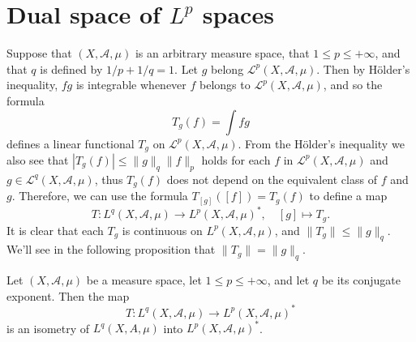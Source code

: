 \section{Dual space of \boldmath$L^p$ spaces}
Suppose that $(X,\mathcal{A},\mu)$ is an arbitrary measure space, that $1\leq p\leq +\infty$, and that $q$ is defined by $1/p+1/q=1$. Let $g$ belong $\mathcal{L}^p(X,\mathcal{A},\mu)$. Then by H\"older's inequality, $fg$ is integrable whenever $f$ belongs to $\mathcal{L}^p(X,\mathcal{A},\mu)$, and so the formula
\[T_g(f)=\int fg\]
defines a linear functional $T_g$ on $\mathcal{L}^p(X,\mathcal{A},\mu)$. From the H\"older's inequality we also see that $|T_g(f)|\leq\|g\|_q\|f\|_p$ holds for each $f$ in $\mathcal{L}^p(X,\mathcal{A},\mu)$ and $g\in\mathcal{L}^q(X,\mathcal{A},\mu)$, thus $T_g(f)$ does not depend on the equivalent class of $f$ and $g$. Therefore, we can use the formula $T_{[g]}([f])=T_g(f)$ to define a map
\[T:L^q(X,\mathcal{A},\mu)\to L^p(X,\mathcal{A},\mu)^*,\quad [g]\mapsto T_g.\]
It is clear that each $T_g$ is continuous on $L^p(X,\mathcal{A},\mu)$, and $\|T_g\|\leq\|g\|_q$. We'll see in the following proposition that $\|T_g\|=\|g\|_q$.
\begin{proposition}\label{L^p dual map isometry}
Let $(X,\mathcal{A},\mu)$ be a measure space, let $1\leq p\leq +\infty$, and let $q$ be its conjugate exponent. Then the map
\[T:L^q(X,\mathcal{A},\mu)\to L^p(X,\mathcal{A},\mu)^*\]
is an isometry of $L^q(X,A,\mu)$ into $L^p(X,\mathcal{A},\mu)^*$.
\end{proposition}
